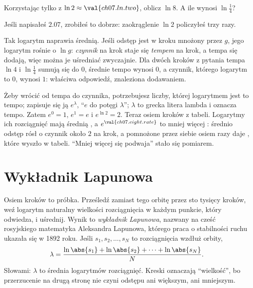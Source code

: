 \begin{think}
Korzystając tylko z $\ln 2 \approx \val{ch07.ln.two}$, oblicz $\ln 8$. A ile
wynosi $\ln\tfrac14$?
\end{think}
Jeśli napisałeś $\num{2.07}$, zrobiłeś to dobrze: zaokrąglenie $\ln 2$
policzyłeś trzy razy.

Tak logarytm naprawia średnią. Jeśli odstęp jest w kroku mnożony przez $g$,
jego logarytm rośnie o $\ln g$: \emph{czynnik} na krok staje się
\emph{tempem} na krok, a tempa się dodają, więc można je uśredniać
zwyczajnie. Dla dwóch kroków z pytania tempa $\ln 4$ i $\ln\tfrac14$
sumują się do $0$, średnie tempo wynosi $0$, a czynnik, którego logarytm to
$0$, wynosi $1$: właściwa odpowiedź, znaleziona dodawaniem.

Żeby wrócić od tempa do czynnika, potrzebujesz liczby, której logarytmem jest
to tempo; zapisuje się ją $e^{\lambda}$, \enquote{$e$ do potęgi $\lambda$};
$\lambda$ to grecka litera lambda i oznacza tempo. Zatem $e^{0} = 1$,
$e^{1} = e$ i $e^{\ln 2} = 2$. Teraz osiem kroków z tabeli. Logarytmy ich
rozciągnięć mają średnią , a
$e^{\val{ch07.eight.rate}}$ to mniej więcej : średnio
odstęp rósł o czynnik około $2$ na krok, a  pomnożone
przez siebie osiem razy daje , które wyszło w tabeli.
\enquote{Mniej więcej się podwaja} stało się pomiarem.

\section{Wykładnik Lapunowa}
\label{sec:ch07-exponent}

\noindent
Osiem kroków to próbka. Prześledź zamiast tego orbitę przez sto tysięcy
kroków, weź logarytm naturalny wielkości rozciągnięcia w każdym punkcie,
który odwiedza, i uśrednij. Wynik to \emph{wykładnik Lapunowa}, nazwany na
cześć rosyjskiego matematyka Aleksandra Lapunowa, którego praca o
stabilności ruchu ukazała się w 1892 roku. Jeśli $s_1, s_2, \dots, s_N$ to
rozciągnięcia wzdłuż orbity,
\[ \lambda = \frac{\ln\abs{s_1} + \ln\abs{s_2} + \dots + \ln\abs{s_N}}{N}. \]
Słowami: $\lambda$ to średnia logarytmów rozciągnięć. Kreski oznaczają
\enquote{wielkość}, bo przerzucenie na drugą stronę nie czyni odstępu ani
większym, ani mniejszym.

